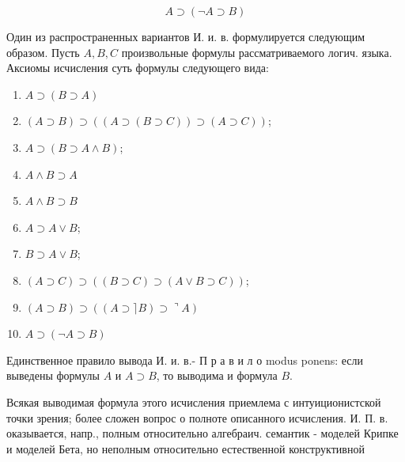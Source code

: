 \documentclass[10pt]{article}
\begin{document}
\[

A \supset(\neg A \supset B)

\]



Один из распространенных вариантов И. и. в. формулируется следующим образом. Пусть $A, B, C$ произвольные формулы рассматриваемого логич. языка. Аксиомы исчисления суть формулы следующего вида:



\begin{enumerate}

  \item $A \supset(B \supset A)$



  \item $(A \supset B) \supset((A \supset(B \supset C)) \supset(A \supset C))$;



  \item $A \supset(B \supset A \wedge B)$;



  \item $A \wedge B \supset A$



  \item $A \wedge B \supset B$



  \item $A \supset A \vee B$;



  \item $B \supset A \vee B$;



  \item $(A \supset C) \supset((B \supset C) \supset(A \vee B \supset C))$;



  \item $(A \supset B) \supset((A \supset\rceil B) \supset\urcorner A)$



  \item $A \supset(\neg A \supset B)$



\end{enumerate}



Единственное правило вывода И. и. в.- П р а в и л о modus ponens: если выведены формулы $A$ и $A \supset B$, то выводима и формула $B$.



Всякая выводимая формула этого исчисления приемлема с интуиционистской точки зрения; более сложен вопрос о полноте описанного исчисления. И. П. в. оказывается, напр., полным относительно алгебраич. семантик - моделей Крипке и моделей Бета, но неполным относительно естественной конструктивной
\end{document}
